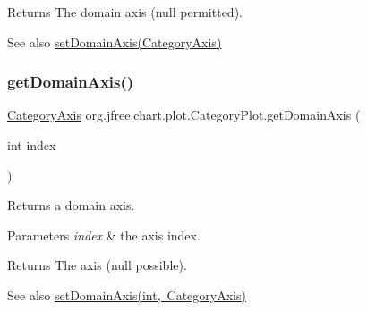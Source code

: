 \begin{DoxyReturn}{Returns}
The domain axis ({\ttfamily null} permitted).
\end{DoxyReturn}
\begin{DoxySeeAlso}{See also}
\mbox{\hyperlink{classorg_1_1jfree_1_1chart_1_1plot_1_1_category_plot_a2d2f1627184e7686e9a74be1f87237f8}{set\+Domain\+Axis(\+Category\+Axis)}} 
\end{DoxySeeAlso}
\mbox{\label{classorg_1_1jfree_1_1chart_1_1plot_1_1_category_plot_ab1dc3f8f848b309404d1a4ca963b11da}} 
\subsubsection{\texorpdfstring{get\+Domain\+Axis()}{getDomainAxis()}\hspace{0.1cm}{\footnotesize\ttfamily [2/2]}}
{\footnotesize\ttfamily \mbox{\hyperlink{classorg_1_1jfree_1_1chart_1_1axis_1_1_category_axis}{Category\+Axis}} org.\+jfree.\+chart.\+plot.\+Category\+Plot.\+get\+Domain\+Axis (\begin{DoxyParamCaption}\item[{int}]{index }\end{DoxyParamCaption})}

Returns a domain axis.


\begin{DoxyParams}{Parameters}
{\em index} & the axis index.\\
\hline
\end{DoxyParams}
\begin{DoxyReturn}{Returns}
The axis ({\ttfamily null} possible).
\end{DoxyReturn}
\begin{DoxySeeAlso}{See also}
\mbox{\hyperlink{classorg_1_1jfree_1_1chart_1_1plot_1_1_category_plot_a1f9906f8a205d94eee2611e4ffd21d70}{set\+Domain\+Axis(int, Category\+Axis)}} 
\end{DoxySeeAlso}
\mbox{\label{classorg_1_1jfree_1_1chart_1_1plot_1_1_category_plot_a8356d96018473d13cd06b388d29a096a}} 
